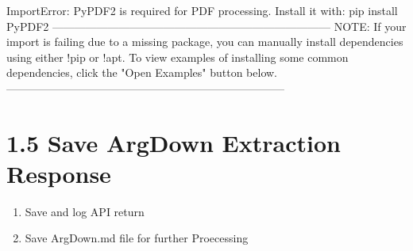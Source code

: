 \documentclass[
  11pt,
  letterpaper,
]{book}
\begin{document}
\begin{Highlighting}
\textcolor{QuartoInternalColor2}{}\textcolor{QuartoInternalColor1}{ImportError}\textcolor{QuartoInternalColor2}{: PyPDF2 is required for PDF processing. Install it with: pip install PyPDF2}
\textcolor{QuartoInternalColor2}{}\textcolor{QuartoInternalColor1}{---------------------------------------------------------------------------}\textcolor{QuartoInternalColor3}{}
\textcolor{QuartoInternalColor3}{NOTE: If your import is failing due to a missing package, you can}
\textcolor{QuartoInternalColor3}{manually install dependencies using either !pip or !apt.}
\textcolor{QuartoInternalColor3}{To view examples of installing some common dependencies, click the}
\textcolor{QuartoInternalColor3}{"Open Examples" button below.}
\textcolor{QuartoInternalColor3}{}\textcolor{QuartoInternalColor1}{---------------------------------------------------------------------------}\textcolor{QuartoInternalColor2}{}
\end{Highlighting}

\section{1.5 Save ArgDown Extraction
Response}\label{save-argdown-extraction-response}

\begin{enumerate}
\def\labelenumi{\arabic{enumi}.}
\item
  Save and log API return
\item
  Save ArgDown.md file for further Proecessing
\end{enumerate}
\end{document}
